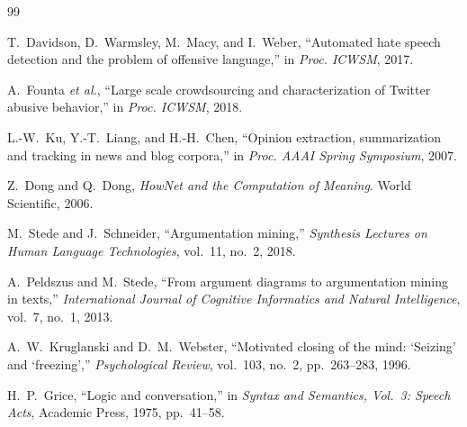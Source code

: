 \documentclass[11pt,a4paper]{article}
\begin{document}
\begin{thebibliography}{99}

T.~Davidson, D.~Warmsley, M.~Macy, and I.~Weber,
``Automated hate speech detection and the problem of offensive language,''
in \emph{Proc. ICWSM}, 2017.

A.~Founta \emph{et al.},
``Large scale crowdsourcing and characterization of Twitter abusive behavior,''
in \emph{Proc. ICWSM}, 2018.

L.-W.~Ku, Y.-T.~Liang, and H.-H.~Chen,
``Opinion extraction, summarization and tracking in news and blog corpora,''
in \emph{Proc. AAAI Spring Symposium}, 2007.

Z.~Dong and Q.~Dong,
\emph{HowNet and the Computation of Meaning}.
World Scientific, 2006.

M.~Stede and J.~Schneider,
``Argumentation mining,''
\emph{Synthesis Lectures on Human Language Technologies},
vol.~11, no.~2, 2018.

A.~Peldszus and M.~Stede,
``From argument diagrams to argumentation mining in texts,''
\emph{International Journal of Cognitive Informatics and Natural Intelligence},
vol.~7, no.~1, 2013.

A.~W.~Kruglanski and D.~M.~Webster,
``Motivated closing of the mind: `Seizing' and `freezing',''
\emph{Psychological Review}, vol.~103, no.~2, pp.~263--283, 1996.

H.~P.~Grice,
``Logic and conversation,''
in \emph{Syntax and Semantics, Vol.~3: Speech Acts},
Academic Press, 1975, pp.~41--58.

\end{thebibliography}
\end{document}
